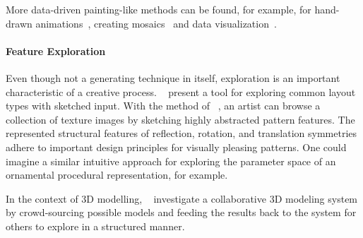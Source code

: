 
More data-driven painting-like methods can be found, for example, for hand-drawn animations~\cite{xing_2015_aha}, creating mosaics~\cite{igarashi_2010_dde,abdrashitov_2014_msi} and data visualization~\cite{xia_2018_ddc}.


\paragraph*{Feature Exploration}
\label{para:analysis_rulebased_exploration}

Even though not a generating technique in itself, exploration is an important characteristic of a creative process. \citeauthor*{todi_2016_sse}~\cite{todi_2016_sse} present a tool for exploring common layout types with sketched input. With the method of \citeauthor*{chen_2016_msi}~\cite{chen_2016_msi}, an artist can browse a collection of texture images by sketching highly abstracted pattern features. The represented structural features of reflection, rotation, and translation symmetries adhere to important design principles for visually pleasing patterns. One could imagine a similar intuitive approach for exploring the parameter space of an ornamental procedural representation, for example.

In the context of 3D modelling, \citeauthor*{talton_2009_emw}~\cite{talton_2009_emw} investigate a collaborative 3D modeling system by crowd-sourcing possible models and feeding the results back to the system for others to explore in a structured manner. 

